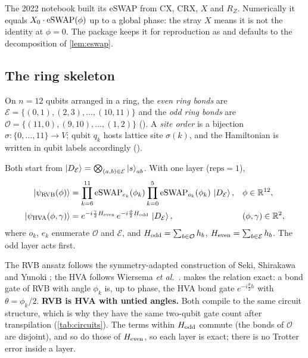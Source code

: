 \begin{rem}
  The 2022 notebook built its eSWAP from $\mathrm{CX}$, $\mathrm{CRX}$, $X$ and $R_Z$.
  Numerically it equals $X_0\cdot\mathrm{eSWAP}(\phi)$ up to a global phase: the stray $X$ means it is
  not the identity at $\phi=0$. The package keeps it for reproduction as
   and defaults to the decomposition of \cref{lem:eswap}.
\end{rem}

\subsection{The ring skeleton}

\begin{dfn}\label{dfn:ring}
  On $n=12$ qubits arranged in a ring, the \emph{even ring bonds} are
  $\mathcal E=\{(0,1),(2,3),\dots,(10,11)\}$ and the \emph{odd ring bonds} are
  $\mathcal O=\{(11,0),(9,10),\dots,(1,2)\}$ (). A \emph{site order} is a bijection
  $\sigma:\{0,\dots,11\}\to V$; qubit $q_k$ hosts lattice site $\sigma(k)$, and the Hamiltonian is
  written in qubit labels accordingly ().
\end{dfn}

\begin{dfn}\label{dfn:ansatz}
  Both start from $\ket{D_\mathcal E}=\bigotimes_{(a,b)\in\mathcal E}\ket s_{ab}$. With one layer
  ($\mathrm{reps}=1$),
  \begin{align*}
    \ket{\psi_{\mathrm{RVB}}(\phi)}&=\prod_{k=6}^{11}\mathrm{eSWAP}_{e_k}(\phi_k)\prod_{k=0}^{5}\mathrm{eSWAP}_{o_k}(\phi_k)\,\ket{D_\mathcal E},
      &&\phi\in\mathbb{R}^{12},\\
    \ket{\psi_{\mathrm{HVA}}(\phi,\gamma)}&=e^{-i\frac\gamma2H_{\mathrm{even}}}\,e^{-i\frac\phi2H_{\mathrm{odd}}}\,\ket{D_\mathcal E},
      &&(\phi,\gamma)\in\mathbb{R}^{2},
  \end{align*}
  where $o_k$, $e_k$ enumerate $\mathcal O$ and $\mathcal E$, and $H_{\mathrm{odd}}=\sum_{b\in\mathcal O}h_b$,
  $H_{\mathrm{even}}=\sum_{b\in\mathcal E}h_b$. The odd layer acts first.
\end{dfn}

The RVB ansatz follows the symmetry-adapted construction of Seki, Shirakawa and Yunoki
\parencite{seki2020}; the HVA follows Wiersema \emph{et al.}\ \parencite{wiersema2020}.
 makes the relation exact: a bond gate of RVB with angle $\phi_k$ is,
up to phase, the HVA bond gate $e^{-i\frac\theta2h}$ with $\theta=\phi_k/2$. \textbf{RVB is HVA
with untied angles.} Both compile to the same circuit structure, which is why they have the same
two-qubit gate count after transpilation (\cref{tab:circuits}). The terms within $H_{\mathrm{odd}}$ commute
(the bonds of $\mathcal O$ are disjoint), and so do those of $H_{\mathrm{even}}$, so each layer is exact; there is
no Trotter error inside a layer.

